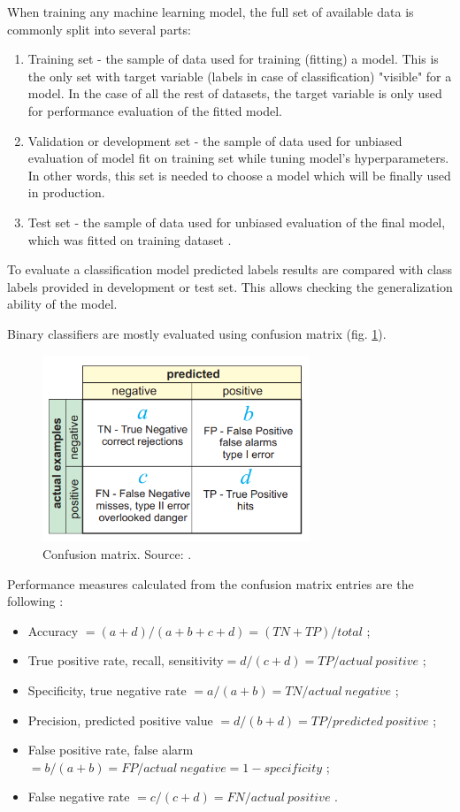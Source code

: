 When training any machine learning model, the full set of available data is commonly split into several parts:
\begin{enumerate}
    \item Training set - the sample of data used for training (fitting) a model. This is the only set with target variable (labels in case of classification) "visible" for a model. In the case of all the rest of datasets, the target variable is only used for performance evaluation of the fitted model. 
    \item Validation or development set - the sample of data used for unbiased evaluation of model fit on training set while tuning model's hyperparameters. In other words, this set is needed to choose a model which will be finally used in production.
    \item Test set - the sample of data used for unbiased evaluation of the final model, which was fitted on training dataset \citep{Kuhn-2013}.
\end{enumerate}

To evaluate a classification model predicted labels results are compared with class labels provided in development or test set. This allows checking the generalization ability of the model.

Binary classifiers are mostly evaluated using confusion matrix (fig. \ref{fig:confusion-matrix}).

\begin{figure}[h]
    \centering
    \includegraphics[width=8cm]{Images/Confusion-matrix.png}
    \caption{Confusion matrix. Source: \citep{kohavi:glossary}.}
    \label{fig:confusion-matrix}
\end{figure}

Performance measures calculated from the confusion matrix entries are the following \citep{kohavi:glossary}:
\begin{itemize}
    \item Accuracy $= (a + d)/(a + b + c + d) =
    (TN + TP)/total$ ;
    \item True positive rate, recall, sensitivity$ =
    d/(c + d) = TP/actual\: positive$ ;
    \item Specificity, true negative rate $= a/(a + b) =
    TN/actual\: negative$ ; 
    \item Precision, predicted positive value $=
    d/(b + d) = TP/predicted\: positive$ ;
    \item False positive rate, false alarm $= b/(a + b)
    = FP/actual\: negative = 1 - specificity$ ;
    \item False negative rate $= c/(c + d) = FN/actual\: positive$ .
\end{itemize}

